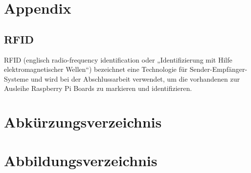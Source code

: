 \appendix
\chapter{Appendix}

\section{RFID}
\label{sec:appendix:rfid}
RFID (englisch radio-frequency identification oder „Identifizierung mit Hilfe elektromagnetischer Wellen“) bezeichnet eine Technologie für Sender-Empfänger-Systeme und wird bei der Abschlussarbeit verwendet, um die vorhandenen zur Ausleihe Raspberry Pi Boards zu markieren und identifizieren.
 

\chapter{Abkürzungsverzeichnis}
\label{sec:list_abbr}
\begin{acronym}[SEPSEP]
	
\end{acronym}


\chapter{Abbildungsverzeichnis}
\label{sec:list_img}
\renewcommand{\cftfigpresnum}{Abb. } 
\renewcommand{\listfigurename}{}
\setlength{\cftfignumwidth}{2 cm}
\listoffigures{}%

